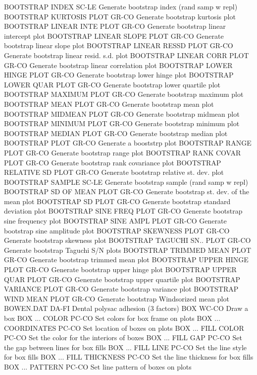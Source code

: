 BOOTSTRAP INDEX             SC-LE Generate bootstrap index (rand samp w repl)
BOOTSTRAP KURTOSIS PLOT     GR-CO Generate bootstrap kurtosis plot
BOOTSTRAP LINEAR INTE PLOT  GR-CO Generate bootstrap linear intercept plot
BOOTSTRAP LINEAR SLOPE PLOT GR-CO Generate bootstrap linear slope plot
BOOTSTRAP LINEAR RESSD PLOT GR-CO Generate bootstrap linear resid. s.d. plot
BOOTSTRAP LINEAR CORR PLOT  GR-CO Generate bootstrap linear correlation plot
BOOTSTRAP LOWER HINGE PLOT  GR-CO Generate bootstrap lower hinge plot
BOOTSTRAP LOWER QUAR PLOT   GR-CO Generate bootstrap lower quartile plot
BOOTSTRAP MAXIMUM PLOT      GR-CO Generate bootstrap maximum plot
BOOTSTRAP MEAN PLOT         GR-CO Generate bootstrap mean plot
BOOTSTRAP MIDMEAN PLOT      GR-CO Generate bootstrap midmean plot
BOOTSTRAP MINIMUM PLOT      GR-CO Generate bootstrap minimum plot
BOOTSTRAP MEDIAN PLOT       GR-CO Generate bootstrap median plot
BOOTSTRAP PLOT              GR-CO Generate a booststrp plot
BOOTSTRAP RANGE PLOT        GR-CO Generate bootstrap range plot
BOOTSTRAP RANK COVAR PLOT   GR-CO Generate bootstrap rank covariance plot
BOOTSTRAP RELATIVE SD PLOT  GR-CO Generate bootstrap relative st. dev. plot
BOOTSTRAP SAMPLE            SC-LE Generate bootstrap sample (rand samp w repl)
BOOTSTRAP SD OF MEAN PLOT   GR-CO Generate bootstrap st. dev. of the mean plot
BOOTSTRAP SD PLOT           GR-CO Generate bootstrap standard deviation plot
BOOTSTRAP SINE FREQ PLOT    GR-CO Generate bootstrap sine frequency plot
BOOTSTRAP SINE AMPL PLOT    GR-CO Generate bootstrap sine amplitude plot
BOOTSTRAP SKEWNESS PLOT     GR-CO Generate bootstrap skewness plot
BOOTSTRAP TAGUCHI SN.. PLOT GR-CO Generate bootstrap Taguchi S/N plots
BOOTSTRAP TRIMMED MEAN PLOT GR-CO Generate bootstrap trimmed mean plot
BOOTSTRAP UPPER HINGE PLOT  GR-CO Generate bootstrap upper hinge plot
BOOTSTRAP UPPER QUAR PLOT   GR-CO Generate bootstrap upper quartile plot
BOOTSTRAP VARIANCE PLOT     GR-CO Generate bootstrap variance plot
BOOTSTRAP WIND MEAN PLOT    GR-CO Generate bootstrap Windsorized mean plot
BOWEN.DAT                   DA-FI Dental polysac adhesion (3 factors)
BOX                         WC-CO Draw a box
BOX ... COLOR               PC-CO Set colors for box frame on plots
BOX ... COORDINATES         PC-CO Set location of boxes on plots
BOX ... FILL COLOR          PC-CO Set the color for the interiors of boxes
BOX ... FILL GAP            PC-CO Set the gap between lines for box fills
BOX ... FILL LINE           PC-CO Set the line style for box fills
BOX ... FILL THICKNESS      PC-CO Set the line thickness for box fills
BOX ... PATTERN             PC-CO Set line pattern of boxes on plots
